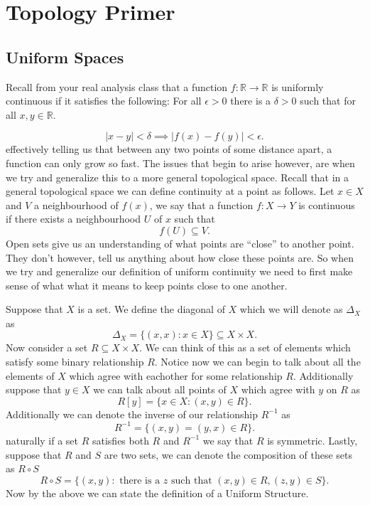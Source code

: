 \section{Topology Primer}%
\label{sec:Topology Primer}

\subsection{Uniform Spaces}

Recall from your real analysis class that a function $f: \mathbb{R} \to
\mathbb{R}$ is uniformly continuous if it satisfies the following: For all
$\epsilon > 0$ there is a $\delta > 0$ such that for all $x, y \in \mathbb{R}$.

\[
| x - y| < \delta \implies |f(x) - f(y)| < \epsilon
.\] 
effectively telling us that between any two points of some distance apart, a 
function can only grow so fast. The issues that begin to arise however, are 
when we try and generalize this to a more general topological space. Recall 
that in a general topological space we can define continuity at a point as 
follows. Let $x \in X$ and $V$ a neighbourhood of $f(x)$, we say that
a function $f: X \to Y$ is continuous if there exists a neighbourhood $U$ of
$x$ such that
\[
f(U) \subseteq V
.\] 
Open sets give us an understanding of what points are ``close'' to
another point. They don't however, tell us anything about how close these
points are. So when we try and generalize our definition of uniform continuity
we need to first make sense of what what it means to keep points close to one
another.

Suppose that $X$ is a set. We define the diagonal of $X$ which we will denote
as $\Delta_X$ as 
\[
\Delta_X = \{(x, x): x \in X\} \subseteq X \times X
.\] 
Now consider a set $R \subseteq X \times X$. We can think of this as a set of
elements which satisfy some binary relationship $R$. Notice now we can begin to
talk about all the elements of $X$ which agree with eachother for some
relationship $R$. Additionally suppose that $y \in X$ we can talk about all
points of $X$ which agree with $y$ on $R$ as
\[
  R[y] = \{x \in X: (x, y) \in R\} 
.\] 
Additionally we can denote the inverse of our relationship $R^{-1}$ as
\[
  R^{-1} = \{(x, y) = (y, x) \in R \}
.\] 
naturally if a set $R$ satisfies both $R$ and $R^{-1}$ we say that $R$ is
symmetric. Lastly, suppose that $R$ and $S$ are two sets, we can denote the
composition of these sets as $R \circ S$
\[
R \circ S = \{(x, y): \textrm{ there is a $z$ such that $(x, y) \in R, (z, y)
\in S$}\} 
.\] 
Now by the above we can state the definition of a Uniform Structure.

